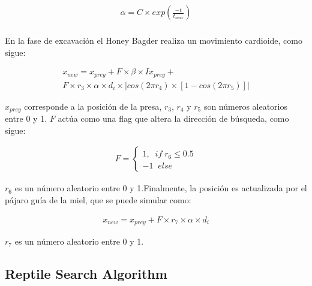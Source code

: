 \documentclass[conference]{IEEEtran}
\begin{document}
\begin{equation}
	\begin{gathered}
		\alpha = C \times exp (\frac{-t}{t_{max}})\\
	\end{gathered}
	\label{eq29}
\end{equation}

\noindent En la fase de excavación el Honey Bagder realiza un movimiento cardioide, como sigue:

\begin{equation}
	\begin{gathered}
		x_{new}=x_{prey}+F \times \beta \times I x_{prey} + \\
		F \times r_3 \times \alpha \times d_i  \times |cos(2\pi r_4) \times [1-cos(2\pi r_5)]|
	\end{gathered}
	\label{eq30}
\end{equation}

\noindent $x_{prey}$ corresponde a la posición de la presa, $r_3$, $r_4$ y $r_5$ son números aleatorios entre 0 y 1. $F$ actúa como una flag que altera la dirección de búsqueda, como sigue:

\begin{equation}
	\begin{gathered}
		F=
		\begin{cases}
			1, \; \; if \; r_6 \leq 0.5 \\
			-1 \; \; else               
		\end{cases}
	\end{gathered}
	\label{eq31}
\end{equation}    

\noindent $r_6$ es un número aleatorio entre 0 y 1.Finalmente, la posición es actualizada por el pájaro guía de la miel, que se puede simular como:

\begin{equation}
	\begin{gathered}
		x_{new}=x_{prey}+F\times r_7\times \alpha \times d_i
	\end{gathered}
	\label{eq32}
\end{equation}

\noindent $r_7$ es un número aleatorio entre 0 y 1.

\subsection{Reptile Search Algorithm}
\end{document}
